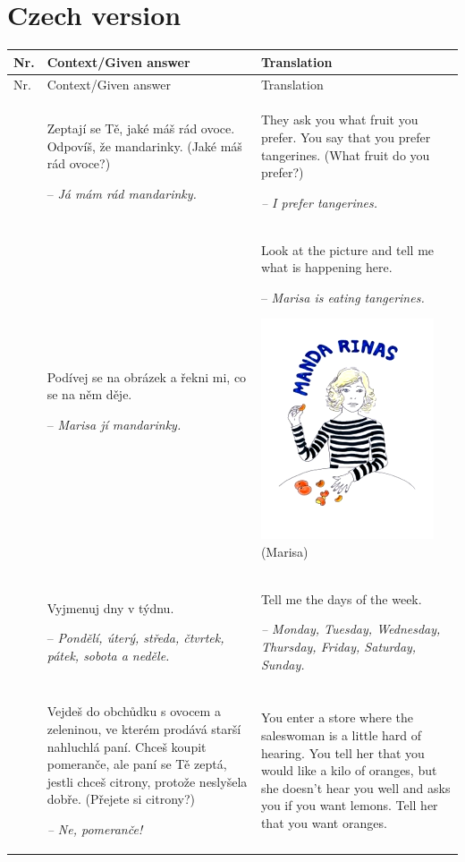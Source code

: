 \section{Czech version}\label{app:a3}
\begin{xltabular}{\textwidth}{lQQ}
\lsptoprule Nr. & Context\slash Given answer & Translation\\\midrule\endfirsthead
\midrule Nr. & Context\slash Given answer & Translation\\\midrule\endhead
\endfoot\lspbottomrule{} & Zeptají se Tě, jaké máš rád ovoce. Odpovíš, že mandarinky. (Jaké máš rád ovoce?)

-- \textit{Já mám rád mandarinky.} & They ask you what fruit you prefer. You say that you prefer tangerines. (What fruit do you prefer?)

{\itshape -- I prefer tangerines.}\\
 & Podívej se na obrázek a řekni mi, co se na něm děje.

-- \textit{Marisa jí mandarinky.} & Look at the picture and tell me what is happening here.

-- \textit{Marisa is eating tangerines.}


\includegraphics[width=.3\textwidth]{figures/a08HabilAppendix-img001.png}
 (Marisa)\\
  & Vyjmenuj dny v týdnu.

-- \textit{Pondělí, úterý, středa, čtvrtek, pátek, sobota a neděle.} & Tell me the days of the week.

{\itshape -- Monday, Tuesday, Wednesday, Thursday, Friday, Saturday, Sunday.}\\
 & Vejdeš do obchůdku s ovocem a zeleninou, ve kterém prodává starší nahluchlá paní. Chceš koupit pomeranče, ale paní se Tě zeptá, jestli chceš citrony, protože neslyšela dobře. (Přejete si citrony?)

{\itshape -- Ne, pomeranče!} & You enter a store where the saleswoman is a little hard of hearing. You tell her that you would like a kilo of oranges, but she doesn’t hear you well and asks you if you want lemons. Tell her that you want oranges.


\end{xltabular}
